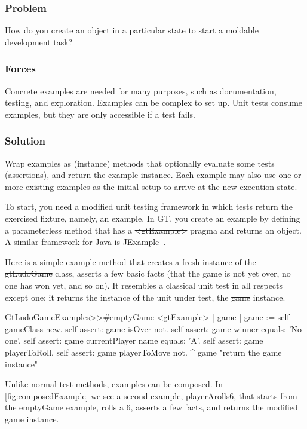 \documentclass[sigconf]{acmart}
\begin{document}
\subsubsection*{Problem}
How do you create an object in a particular state to start a moldable development task?

\subsubsection*{Forces}
Concrete examples are needed for many purposes, such as documentation, testing, and exploration.
Examples can be complex to set up.
Unit tests consume examples, but they are only accessible if a test fails.

\subsubsection*{Solution}
Wrap examples as (instance) methods that optionally evaluate some tests (assertions), and return the example instance.
Each example may also use one or more existing examples as the initial setup to arrive at the new execution state.

To start, you need a modified unit testing framework in which tests return the exercised fixture, namely, an example.
In GT, you create an example by defining a parameterless method that has a \st{<gtExample>} pragma and returns an object.
A similar framework for Java is JExample~\cite{Kuhn08a}.

Here is a simple example method that creates a fresh instance of the \st{gtLudoGame} class, asserts a few basic facts (\ie that the game is not yet over, no one has won yet, and so on).
It resembles a classical unit test in all respects except one: it returns the instance of the unit under test, \ie the \st{game} instance.

\begin{code}
GtLudoGameExamples>>#emptyGame
	<gtExample>
	| game |
	game := self gameClass new.
	self assert: game isOver not.
	self assert: game winner equals: 'No one'.
	self assert: game currentPlayer name equals: 'A'.
	self assert: game playerToRoll.
	self assert: game playerToMove not.
	^ game  "return the game instance"
\end{code}

Unlike normal test methods, examples can be composed.
In \autoref{fig:composedExample} we see a second example, \st{playerArolls6}, that starts from the \st{emptyGame} example, rolls a $6$, asserts a few facts, and returns the modified game instance.
\end{document}
